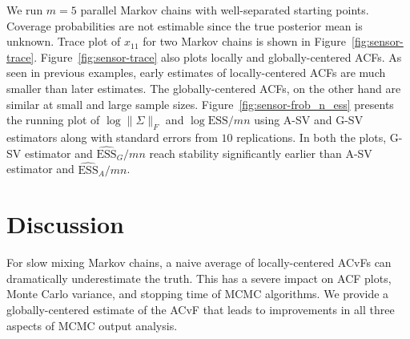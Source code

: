 \documentclass[11pt]{article}
\theoremstyle{remark}
\begin{document}
We run $m = 5$ parallel Markov chains with well-separated starting points. Coverage probabilities are not estimable since the true posterior mean is unknown. Trace plot of $x_{11}$ for two Markov chains is shown in Figure~\ref{fig:sensor-trace}. Figure~\ref{fig:sensor-trace} also  plots locally and globally-centered ACFs. As seen in previous examples, early estimates of locally-centered ACFs are much smaller than later estimates. The globally-centered ACFs, on the other hand are similar at small and large sample sizes. Figure~\ref{fig:sensor-frob_n_ess} presents the running plot of $\log \|{\Sigma}\|_F$ and $\log \textrm{ESS}/mn$ using A-SV and G-SV  estimators along with standard errors from $10$ replications. In both the plots, G-SV estimator and $\widehat{\textrm{ESS}}_G/mn$ reach stability significantly earlier than A-SV estimator and $\widehat{\textrm{ESS}}_A/mn$.

 
\section{Discussion} \label{sec:discussion}



For slow mixing Markov chains, a naive average of locally-centered ACvFs can dramatically underestimate the truth. This has a severe impact on ACF plots, Monte Carlo variance, and stopping time of MCMC algorithms. We provide a globally-centered estimate of the ACvF that leads to improvements in all three aspects of MCMC output analysis.




\end{document}
